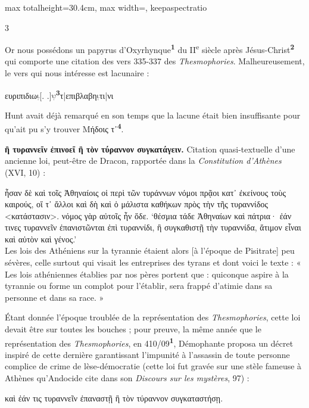 \documentclass[11pt,twoside]{book}
\newcommand{\italique}[1]{\textit{#1}}
\newcommand{\citComm}[1]{\begin{quoting}[vskip=0.4pt,leftmargin=0.7em,rightmargin=0.2em]#1\end{quoting}}
\newcommand{\nieme}[1]{#1\textsuperscript{e}}
\newcommand{\francais}[1]{{\policeFr #1}}
\newcommand{\grec}[1]{{\policeGr #1}}
\newcommand{\douteux}[1]{$\underset{\cdot}{\text{#1}}$}
\newcommand{\marqueur}[1]{\textsuperscript{\color{rubricRed}\textbf{#1}}}
\begin{document}
\begin{adjustbox}{max totalheight=30.4cm, max width=\textwidth, keepaspectratio}
\begin{minipage}{\textwidth}
{\begin{multicols}{3}
\par\vspace{1.5pt}
\noindent Or nous possédons un papyrus d'Oxyrhynque\marqueur{1} du \nieme{II} siècle après Jésus-Christ\marqueur{2} qui comporte une citation des vers 335-337 des \italique{Thesmophories}. Malheureusement, le vers qui nous intéresse est lacunaire :
\citComm{ευριπιδιω\douteux{ι}[. .]\douteux{υ}\marqueur{3}τ|επιβλαβη\douteux{ι}τι|νι}
\par\vspace{1.5pt}
\noindent Hunt avait déjà remarqué en son temps que la lacune était bien insuffisante pour qu'ait pu s'y trouver Μήδοις τ᾽\marqueur{4}.
\par\vspace{1.5pt}
 \textbf{ἢ τυραννεῖν ἐπινοεῖ ἢ τὸν τύραννον συγκατάγειν.} Citation quasi-textuelle d'une ancienne loi, peut-être de Dracon, rapportée dans la \italique{Constitution d'Athènes} (XVI, 10) :
\citComm{ἦσαν δὲ καὶ τοῖς Ἀθηναίοις οἱ περὶ τῶν τυράννων νόμοι πρᾷοι κατ᾽ ἐκείνους τοὺς καιρούς, οἵ τ᾽ ἄλλοι καὶ δὴ καὶ ὁ μάλιστα καθήκων πρὸς τὴν τῆς τυραννίδος <κατάστασιν>. νόμος γὰρ αὐτοῖς ἦν ὅδε. `θέσμια τάδε Ἀθηναίων καὶ πάτρια· ἐάν τινες τυραννεῖν ἐπανιστῶνται ἐπὶ τυραννίδι, ἢ συγκαθιστῇ τὴν τυραννίδα, ἄτιμον εἶναι καὶ αὐτὸν καὶ γένος.'\\
\francais{Les lois des Athéniens sur la tyrannie étaient alors [à l'époque de Pisitrate] peu sévères, celle surtout qui visait les entreprises des tyrans et dont voici le texte : « Les lois athéniennes établies par nos pères portent que : quiconque aspire à la tyrannie ou forme un complot pour l'établir, sera frappé d'atimie dans sa personne et dans sa race. »}}
\par\vspace{1.5pt}
\noindent Étant donnée l'époque troublée de la représentation des \italique{Thesmophories}, cette loi devait être sur toutes les bouches ; pour preuve, la même année que le représentation des \italique{Thesmophories}, en 410/09\marqueur{1}, Démophante proposa un décret inspiré de cette dernière garantissant l'impunité à l'assassin de toute personne complice de crime de lèse-démocratie (cette loi fut gravée sur une stèle fameuse à Athènes qu'Andocide cite dans son \italique{Discours sur les mystères}, 97) :
\citComm{\grec{καὶ ἐάν τις τυραννεῖν ἐπαναστῇ ἢ τὸν τύραννον συγκαταστήσῃ}.}
\par\vspace{1.5pt}

\end{multicols}}
\end{minipage}
\end{adjustbox}
\end{document}
